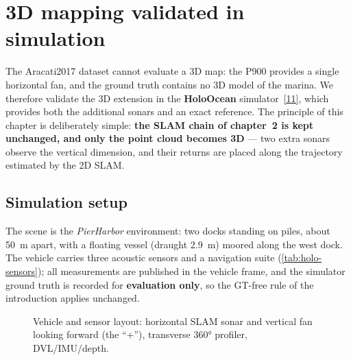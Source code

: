 \section{3D mapping validated in simulation}
\label{sec:chap3}

The Aracati2017 dataset cannot evaluate a 3D map: the P900 provides a single
horizontal fan, and the ground truth contains no 3D model of the marina. We
therefore validate the 3D extension in the \textbf{HoloOcean} simulator~\hyperref[bib:holoocean]{[11]},
which provides both the additional sonars and an exact reference. The principle
of this chapter is deliberately simple: \textbf{the SLAM chain of chapter~2 is
kept unchanged, and only the point cloud becomes 3D} — two extra sonars observe
the vertical dimension, and their returns are placed along the trajectory
estimated by the 2D SLAM.

\subsection{Simulation setup}
\label{sec:holo-setup}

The scene is the \emph{PierHarbor} environment: two docks standing on piles,
about 50~m apart, with a floating vessel (draught 2.9~m) moored along the west
dock. The vehicle carries three acoustic sensors and a navigation suite
(\autoref{tab:holo-sensors}); all measurements are published in the vehicle
frame, and the simulator ground truth is recorded for \textbf{evaluation only},
so the GT-free rule of the introduction applies unchanged.

\begin{figure}[H]
\centering
{}
\caption{Vehicle and sensor layout: horizontal SLAM sonar and vertical fan
looking forward (the ``+''), transverse 360° profiler, DVL/IMU/depth.}
\label{fig:holo-uv}
\end{figure}

